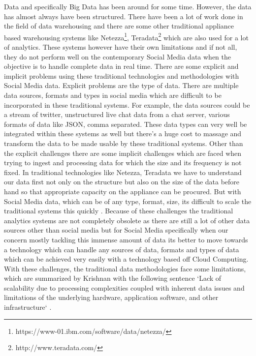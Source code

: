 \documentclass[sigconf]{acmart}
\begin{document}
Data and specifically Big Data has been around for some time. However, the data has almost always have been structured. There have been a lot of work done in the field of data warehousing and there are some other traditional appliance based warehousing systems like Netezza\footnote{https://www-01.ibm.com/software/data/netezza/}, Teradata\footnote{http://www.teradata.com/} which are also used for a lot of analytics. These systems however have their own limitations and if not all, they do not perform well on the contemporary Social Media data \cite{sebabigdata} when the objective is to handle complete data in real time. There are some explicit and implicit problems using these traditional technologies and methodologies with Social Media data. Explicit problems are the type of data. There are multiple data sources, formats and types in social media which are difficult to be incorporated in these traditional systems. For example, the data sources could be a stream of twitter, unstructured live chat data from a chat server, various formats of data like JSON, comma separated. These data types can very well be integrated within these systems as well but there's a huge cost to massage and transform the data to be made usable by these traditional systems. Other than the explicit challenges there are some implicit challenges which are faced when trying to ingest and processing data for which the size and its frequency is not fixed. In traditional technologies like Netezza, Teradata we have to understand our data first not only on the structure but also on the size of the data before hand so that appropriate capacity on the appliance can be procured. But with Social Media data, which can be of any type, format, size, its difficult to scale the traditional systems this quickly \cite{georgevirthadoop}. Because of these challenges the traditional analytics systems are not completely obsolete as there are still a lot of other data sources other than social media but for Social Media specifically when our concern mostly tackling this immense amount of data its better to move towards a technology which can handle any sources of data, formats and types of data which can be achieved very easily with a technology based off Cloud Computing. With these challenges, the traditional data methodologies face some limitations, which are summarized by Krishnan with the following sentence `Lack of scalability due to processing complexities coupled with inherent data issues and limitations of the underlying hardware, application software, and other infrastructure` \cite{krishnan}.
\end{document}

